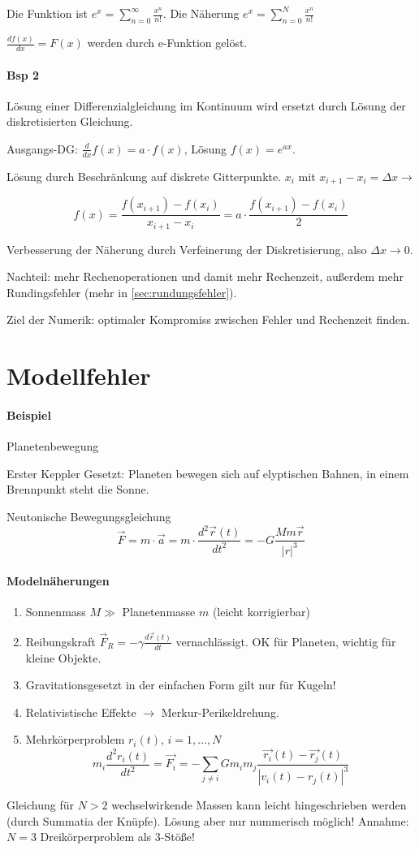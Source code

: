 \documentclass[a4paper,ngerman]{scrbook}
\begin{document}
Die Funktion ist $e^x = \displaystyle\sum^\infty_{n=0} \frac{x^n}{n!}$. Die Näherung $e^x = \displaystyle\sum^N_{n=0} \frac{x^n}{n!}$

$\displaystyle\frac{df(x)}{dx} = F(x)$ werden durch e-Funktion gelöst.

\paragraph{Bsp 2}
Lösung einer Differenzialgleichung im Kontinuum wird ersetzt durch Lösung der diskretisierten Gleichung.

Ausgangs-DG: $\displaystyle\frac{d}{dx}f(x) = a\cdot f(x)$, Lösung $f(x) = e^{ax}$.

Lösung durch Beschränkung auf diskrete Gitterpunkte. $x_i$ mit $x_{i+1} - x_i = \Delta x \to$

\[
f(x) = \frac{f(x_{i+1}) - f(x_i)}{x_{i+1} - x_i} = a\cdot \frac{f(x_{i+1}) - f(x_i)}{2}
\]

Verbesserung der Näherung durch Verfeinerung der Diskretisierung, also $\Delta x \to 0$.

Nachteil: mehr Rechenoperationen und damit mehr Rechenzeit, außerdem mehr Rundingsfehler (mehr in \autoref{sec:rundungsfehler}).

Ziel der Numerik: optimaler Kompromiss zwischen Fehler und Rechenzeit finden.
\section{Modellfehler}
\label{sec:modellfehler}

\paragraph{Beispiel}
Planetenbewegung

Erster Keppler Gesetzt: Planeten bewegen sich auf elyptischen Bahnen, in einem Brennpunkt steht die Sonne.

Neutonische Bewegungsgleichung
\[
\vec{F} = m\cdot \vec{a} = m\cdot \frac{d^2\vec{r}(t)}{dt^2} = -G \frac{Mm\vec{r}}{|r|^3}
\]

\paragraph{Modelnäherungen}

\begin{enumerate}
\item Sonnenmass $M \gg$ Planetenmasse $m$ (leicht korrigierbar)
\item Reibungskraft $\vec{F}_R = -\gamma \frac{d\vec{r}(t)}{dt}$ vernachlässigt. OK für Planeten, wichtig für kleine Objekte.
\item Gravitationsgesetzt in der einfachen Form gilt nur für Kugeln!
\item Relativistische Effekte $\to$ Merkur-Perikeldrehung.
\item Mehrkörperproblem $r_i(t)$, $i=1,\dots,N$
  \[
  m_i \frac{d^2r_i(t)}{dt^2} = \vec{F_i} = -\sum_{j\neq i} G m_i m_j \frac{\vec{r_i}(t) - \vec{r_j}(t)}{|v_i(t) - r_j(t)|^3}
  \]
\end{enumerate}

Gleichung für $N>2$ wechselwirkende Massen kann leicht hingeschrieben werden (durch Summatia der Knüpfe). Lösung aber nur nummerisch möglich! Annahme: $N=3$ Dreikörperproblem als 3-Stöße!
\end{document}
